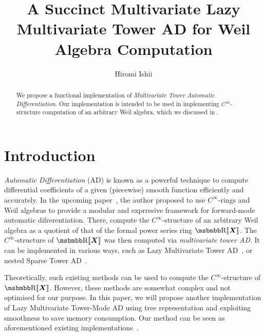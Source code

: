 \documentclass{article}
\title{A Succinct Multivariate Lazy Multivariate Tower AD for Weil Algebra  Computation}
\author{Hiromi Ishii
        \affil{DeepFlow, Inc.}
  }
\date{}
\newcommand{\Rseries}{\R\llbracket\boldsymbol{X}\rrbracket}
\begin{document}
\maketitle

\begin{abstract}
  We propose a functional implementation of \emph{Multivariate Tower Automatic Differentiation}.
  Our implementation is intended to be used in implementing $C^\infty$-structure computation of an arbitrary Weil algebra, which we discussed in \cite{Ishii:2021vw}.
\end{abstract}

\section{Introduction}
\emph{Automatic Differentiation} (AD) is known as a powerful technique to compute differential coefficients of a given (piecewise) smooth function efficiently and accurately.
In the upcoming paper~\cite{Ishii:2021vw}, the author proposed to use \emph{$C^\infty$}-rings and Weil algebras to provide a modular and exprresive framework for forward-mode automatic difrerentiation.
There, compute the $C^\infty$-structure of an arbitrary Weil algebra as a quotient of that of the formal power series ring $\Rseries$.
The $C^\infty$-structure of $\Rseries$ was then computed via \emph{multivariate tower AD}.
It can be implemented in various ways, such as Lazy Multivariate Tower AD~\cite{Pearlmutter:2007aa}, or nested Sparse Tower AD~\cite[{module \texttt{Numeric.AD.Rank1.Sparse}}]{Kmett:2010aa}.

Theoretically, such existing methods can be used to compute the $C^\infty$-structure of $\Rseries$.
However, these methods are somewhat complex and not optimised for our purpose.
In this paper, we will propose another implementation of Lazy Multivariate Tower-Mode AD using tree representation and exploiting smoothness to save memory consumption.
Our method can be seen as aforementioned existing implementations~\cite{Pearlmutter:2007aa,Kmett:2010aa}.


\printbibliography
\end{document}
